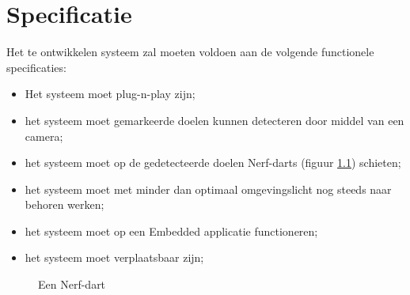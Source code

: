 \chapter{Specificatie}

Het te ontwikkelen systeem zal moeten voldoen aan de volgende functionele
specificaties:

\begin{itemize}
    \item Het systeem moet plug-n-play zijn;
    \item het systeem moet gemarkeerde doelen kunnen detecteren door middel van
        een camera;
    \item het systeem moet op de gedetecteerde doelen Nerf-darts (figuur
        \ref{fig:dart}) schieten;
    \item het systeem moet met minder dan optimaal omgevingslicht nog steeds
        naar behoren werken;
    \item het systeem moet op een Embedded applicatie functioneren;
    \item het systeem moet verplaatsbaar zijn;
\end{itemize}

\begin{figure}
    \caption{Een Nerf-dart}
    \label{fig:dart}
\end{figure}
